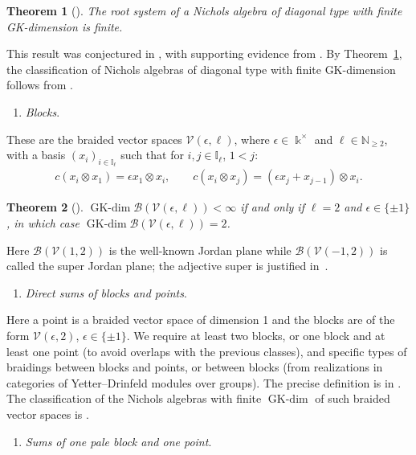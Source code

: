 \documentclass[10pt,a4paper]{amsart}
\numberwithin{equation}{section}
\newtheorem{Theorem}{Theorem}[section]
\newcommand{\GK}{\operatorname{GK-dim}}
\newcommand{\toba}{\mathscr B}
\newcommand{\Vc}{{\mathcal{V}}}
\newcommand{\I}{{\mathbb I}}
\newcommand{\N}{{\mathbb N}}
\begin{document}
\begin{Theorem}[\cite{angiono-garcia2}]\label{thm:conj-AAH} The root system
of a Nichols algebra of diagonal type with finite GK-dimension is finite.
\end{Theorem}

This result was conjectured in \cite[Conjecture 1.3.3]{AAH-triang}, with supporting evidence from \cite{AA,AAH-diag,angiono-garcia, R-quantum-groups}.
By Theorem~\ref{thm:conj-AAH}, the classification of Nichols algebras of diagonal type with finite GK-dimension
follows from \cite{H-classif-RS}.
\begin{enumerate}[label=$(\alph*)$,resume]\itemsep=0pt
\item\label{item:blocks}
\emph{Blocks}.
\end{enumerate}

These are the braided vector spaces $\Vc(\epsilon,\ell)$, where $\epsilon\in \Bbbk^{\times}$ and $\ell \in \N_{\ge 2}$,
with a basis $(x_i)_{i\in\I_\ell}$ such that for $i, j \in \I_\ell$, $1 < j$:
\begin{gather*}%
c(x_i \otimes x_1) = \epsilon x_1 \otimes x_i, \qquad
c(x_i \otimes x_j) =(\epsilon x_j+x_{j-1}) \otimes x_i.
\end{gather*}

\begin{Theorem}[{\cite[Theorem 1.2.2]{AAH-triang}}]\label{th:blocks}
$\GK \toba(\Vc(\epsilon,\ell)) < \infty$ if and only if $\ell = 2$ and $\epsilon \in \{\pm 1\}$, in which case $\GK \toba(\Vc(\epsilon,\ell)) = 2$.
\end{Theorem}

Here $\toba(\Vc(1,2))$ is the well-known Jordan plane while
$\toba(\Vc(-1,2))$ is called the super Jordan plane; the adjective super is justified in~\cite{ap1}.
\begin{enumerate}[label=$(\alph*)$,resume]\itemsep=0pt
\item\label{item:blocks-points}
\emph{Direct sums of blocks and points}.
\end{enumerate}

Here a point is a braided vector space of dimension 1 and the blocks are of the form $\Vc(\epsilon,2)$,
$\epsilon \in \{\pm 1\}$.
We require at least two blocks, or one block and at least one point (to avoid overlaps with the previous classes),
and specific types of braidings between blocks and points, or between blocks (from realizations in categories of Yetter--Drinfeld modules over groups).
The precise definition is in \cite[Section~1.3.1]{AAH-triang}.
The classification of the Nichols algebras with finite $\GK$ of such braided vector spaces is \cite[Theorem~1.3.8]{AAH-triang}.
\begin{enumerate}[label=$(\alph*)$,resume]\itemsep=0pt
\item \label{item:paleblock-point} \emph{Sums of one pale block and one point}.
\end{enumerate}
\end{document}
